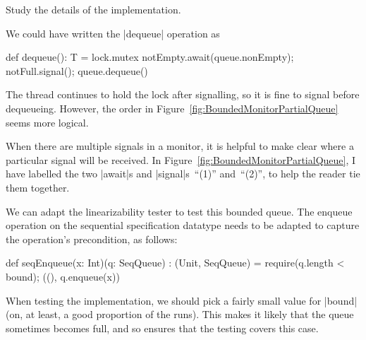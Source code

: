 \begin{instruction}
Study the details of the implementation.
\end{instruction}

We could have written the |dequeue| operation as
%
\begin{scala}
  def dequeue(): T = lock.mutex{
    notEmpty.await(queue.nonEmpty); notFull.signal(); queue.dequeue()
  }
\end{scala}
%
The thread continues to hold the lock after signalling, so it is fine to
signal before dequeueing.  However, the order in
Figure~\ref{fig:BoundedMonitorPartialQueue} seems more logical.

When there are multiple signals in a monitor, it is helpful to make clear
where a particular signal will be received.  In
Figure~\ref{fig:BoundedMonitorPartialQueue}, I have labelled the two |await|s
and |signal|s~``(1)'' and~``(2)'', to help the reader tie them together. 

We can adapt the linearizability tester to test this bounded queue.  The
enqueue operation on the sequential specification datatype needs to be adapted
to capture the operation's precondition, as follows:
%
\begin{scala}
  def seqEnqueue(x: Int)(q: SeqQueue) : (Unit, SeqQueue) = {
    require(q.length < bound); ((), q.enqueue(x))
  }
\end{scala}
%
When testing the implementation, we should pick a fairly small value for
|bound| (on, at least, a good proportion of the runs).  This makes it likely
that the queue sometimes becomes full, and so ensures that the testing covers
this case.
